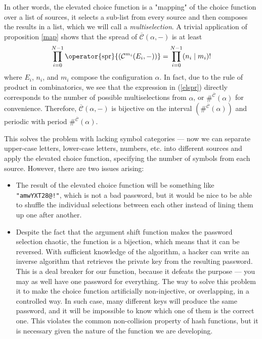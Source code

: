 \documentclass[12pt, a4paper]{article}
\renewcommand{\C}{\mathcal{C}}
\newcommand{\CC}{\overline{\mathcal{C}}}
\newcommand{\spr}[1]{\operator{\mathrm{spr}}{(#1)}}
\begin{document}
In other words, the elevated choice function is a "mapping" of the choice function over a list of sources, it selects a sub-list from every source and then composes the results in a list, which we will call a \emph{multiselection}. A trivial application of proposition \ref{map} shows that the spread of $ \CC(\alpha, -) $ is at least
\begin{equation}\label{elspr}
    \prod\limits_{i = 0}^{N-1} \spr{\C^{m_i}(E_i, -)} = \prod\limits_{i = 0}^{N-1} (n_i \mid m_i)!
\end{equation}
where $ E_i $, $ n_i $, and $ m_i $ compose the configuration $ \alpha $. In fact, due to the rule of product in combinatorics, we see that the expression in (\ref{elspr}) directly corresponds to the number of possible multiselections from $ \alpha $, or $ \#^{\CC}(\alpha) $ for convenience. Therefore, $ \CC(\alpha, -) $ is bijective on the interval $ \left(\#^{\CC}(\alpha)\right) $ and periodic with period $ \#^{\CC}(\alpha) $.

This solves the problem with lacking symbol categories --- now we can separate upper-case letters, lower-case letters, numbers, etc. into different sources and apply the elevated choice function, specifying the number of symbols from each source. However, there are two issues arising:

\begin{itemize}
    \item The result of the elevated choice function will be something like \texttt{"amwYXT28@!"}, which is not a bad password, but it would be nice to be able to shuffle the individual selections between each other instead of lining them up one after another.
    \item Despite the fact that the argument shift function makes the password selection chaotic, the function is a bijection, which means that it can be reversed. With sufficient knowledge of the algorithm, a hacker can write an inverse algorithm that retrieves the private key from the resulting password. This is a deal breaker for our function, because it defeats the purpose --- you may as well have one password for everything. The way to solve this problem it to make the choice function artificially non-injective, or overlapping, in a controlled way. In such case, many different keys will produce the same password, and it will be impossible to know which one of them is the correct one. This violates the common non-collision property of hash functions, but it is necessary given the nature of the function we are developing.
\end{itemize}
\end{document}
